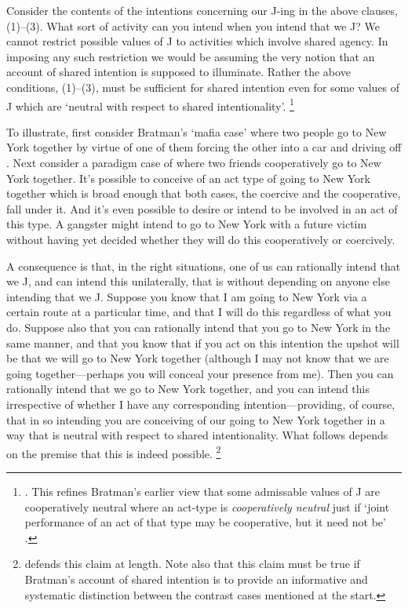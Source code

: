 \documentclass[12pt,\papersize]{extarticle}
\begin{document}
Consider the contents of the intentions concerning our J-ing in the above clauses, (1)--(3). 
What sort of activity can you intend when you intend that we J?
We cannot restrict possible values of J to activities which involve shared agency.
In imposing any such restriction we would be assuming the very notion that an account of shared intention is supposed to illuminate. 
%
Rather the above  conditions, (1)--(3), must be sufficient for shared intention even for some values of J which are `neutral with respect to shared intentionality'.%
\footnote{
 \citet[p.\ 147]{Bratman:1999fr}.
 This refines Bratman's earlier view that some admissable values of J are cooperatively neutral 
 	where an  act-type is \emph{cooperatively neutral} just if `joint performance of an act of that type may be cooperative, but it need not be' \citep[p.\ 330]{Bratman:1992mi}. 
}

To illustrate, first consider Bratman's `mafia case' where two people go to New York together by virtue of one of them forcing the other into a car and driving off \citep[p.\ 333]{Bratman:1992mi}. 
Next consider a paradigm case of where two friends cooperatively go to New York together.
It's possible to conceive of an act type of going to New York together which is broad enough that both cases, the coercive and the cooperative, fall under it.
And it's even possible to desire or intend to be involved in an act of this type.
A gangster might intend to go to New York with a future victim without having yet decided whether they will do this cooperatively or coercively.

A consequence is that, in the right situations, one of us can rationally intend that we J, and can intend this unilaterally, that is without depending on anyone else intending that we J. 
Suppose you know that I am going to New York via a certain route at a particular time, 
and that I will do this regardless of what you do.
Suppose also that you can rationally intend that you go to New York in the same manner,
and that you know that if you act on this intention the upshot will be that we will go to New York together (although I may not know that we are going together---perhaps you will conceal your presence from me).
Then you can rationally intend that we go to New York together, 
	and you can intend this irrespective of whether I have any corresponding intention---providing, of course, that in so intending you are conceiving of our going to New York together in a way that is neutral with respect to shared intentionality.
What follows depends on the premise that this is indeed possible.%
\footnote{ 
\citet{Bratman:1999fr}  defends this claim at length. 
Note also that this claim must be true if Bratman's account of shared intention is to provide an informative and systematic distinction between the contrast cases mentioned at the start.
}
\end{document}
